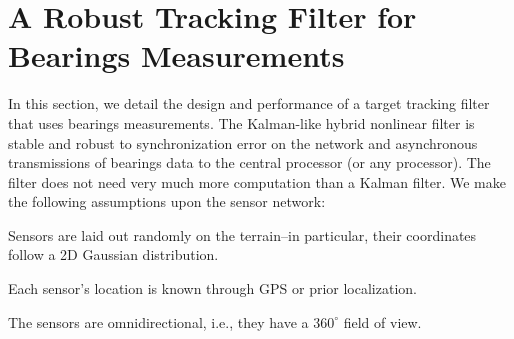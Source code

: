 \section{A Robust Tracking Filter for Bearings Measurements}\label{sec:TrackingFilter}
In this section, we detail the design and performance of a target tracking filter that uses bearings measurements. The Kalman-like hybrid nonlinear filter is stable and robust to synchronization error on the network and asynchronous transmissions of bearings data to the central processor (or any processor). The filter does not need very much more computation than a Kalman filter. We make the following assumptions upon the sensor network:

\begin{assumption}
Sensors are laid out randomly on the terrain--in particular, their coordinates follow a 2D Gaussian distribution.
\end{assumption}
\begin{assumption}
Each sensor's location is known through GPS or prior localization.
\end{assumption}
\begin{assumption}
The sensors are omnidirectional, i.e., they have a $360^\circ$ field of view.
\end{assumption}

